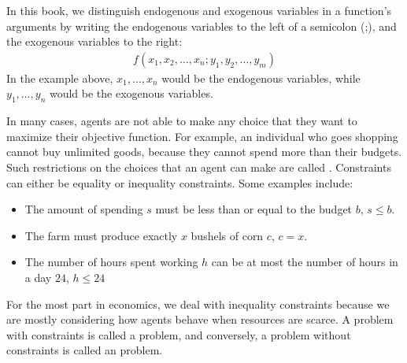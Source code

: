In this book, we distinguish endogenous and exogenous variables in a function's arguments by writing the endogenous variables to the left of a semicolon (;), and the exogenous variables to the right:
\begin{align*}
    f(x_1, x_2, \dots, x_n ; y_1, y_2, \dots, y_m)
\end{align*}
In the example above, $x_1, \dots, x_n$ would be the endogenous variables, while $y_1, \dots, y_n$ would be the exogenous variables. 

In many cases, agents are not able to make any choice that they want to maximize their objective function. For example, an individual who goes shopping cannot buy unlimited goods, because they cannot spend more than their budgets. Such restrictions on the choices that an agent can make are called . Constraints can either be equality or inequality constraints. Some examples include:
\begin{itemize}
    \item The amount of spending $s$ must be less than or equal to the budget $b$, $s \leq b$.
    \item The farm must produce exactly $x$ bushels of corn $c$, $c = x$.
    \item The number of hours spent working $h$ can be at most the number of hours in a day $24$, $h \leq 24$
\end{itemize}
For the most part in economics, we deal with inequality constraints because we are mostly considering how agents behave when resources are scarce. A problem with constraints is called a  problem, and conversely, a problem without constraints is called an  problem.

